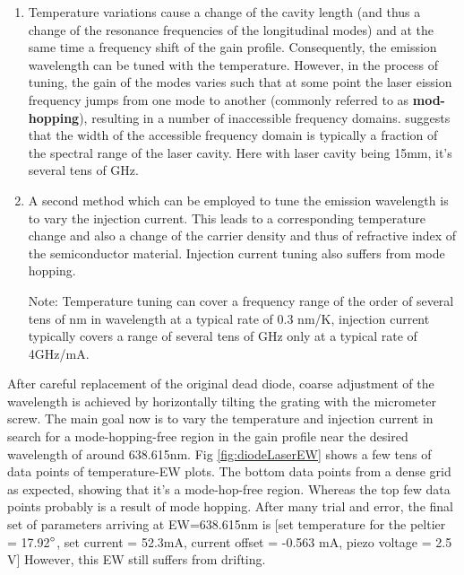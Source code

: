 \documentclass[12pt]{report}
\begin{document}
\begin{enumerate}
    \item Temperature variations cause a change of the cavity length (and thus a change of the resonance frequencies of the longitudinal modes) and at the same time a frequency shift of the gain profile. Consequently, the emission wavelength can be tuned with the temperature. However, in the process of tuning, the gain of the modes varies such that at some point the laser eission frequency jumps from one mode to another (commonly referred to as \textbf{mod-hopping}), resulting in a number of inaccessible frequency domains. \cite{compactGratingDiodeLaser} suggests that the width of the accessible frequency domain is typically a fraction of the spectral range of the laser cavity. Here with laser cavity being 15mm, it's several tens of GHz.

    \item A second method which can be employed to tune the emission wavelength is to vary the injection current. This leads to a corresponding temperature change and also a change of the carrier density and thus of refractive index of the semiconductor material. Injection current tuning also suffers from mode hopping. 
    \par
    Note: Temperature tuning can cover a frequency range of the order of several tens of nm in wavelength at a typical rate of 0.3 nm/K, injection current typically covers a range of several tens of GHz only at a typical rate of 4GHz/mA. 
\end{enumerate}
 
After careful replacement of the original dead diode, coarse adjustment of the wavelength is achieved by horizontally tilting the grating with the micrometer screw. The main goal now is to vary the temperature and injection current in search for a mode-hopping-free region in the gain profile near the desired wavelength of around 638.615nm. Fig \ref{fig:diodeLaserEW} shows a few tens of data points of temperature-EW plots. The bottom data points from a dense grid as expected, showing that it's a mode-hop-free region. Whereas the top few data points probably is a result of mode hopping. After many trial and error, the final set of parameters arriving at EW=638.615nm is [set temperature for the peltier = 17.92$\degree$, set current = 52.3mA, current offset = -0.563 mA, piezo voltage = 2.5 V] However, this EW still suffers from drifting. 
\end{document}
